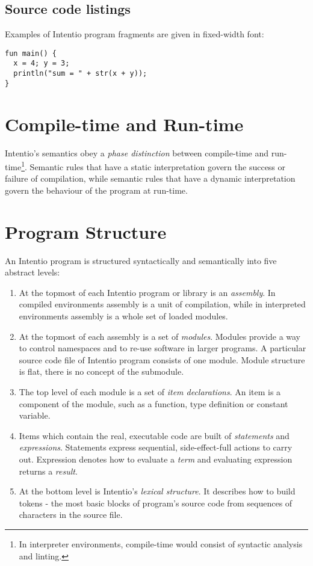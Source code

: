 \subsection*{Source code listings}

Examples of Intentio program fragments are given in fixed-width font:

\begin{lstlisting}
fun main() {
  x = 4; y = 3;
  println("sum = " + str(x + y));
}
\end{lstlisting}


\section{Compile-time and Run-time}

Intentio's semantics obey a \emph{phase distinction} between compile-time and run-time\footnote{In interpreter environments, compile-time would consist of syntactic analysis and linting.}. Semantic rules that have a static interpretation govern the success or failure of compilation, while semantic rules that have a dynamic interpretation govern the behaviour of the program at run-time.


\section{Program Structure}

An Intentio program is structured syntactically and semantically into five abstract levels:

\begin{enumerate}
  \item At the topmost of each Intentio program or library is an \emph{assembly}. In compiled environments assembly is a unit of compilation, while in interpreted environments assembly is a whole set of loaded modules.
  \item At the topmost of each assembly is a set of \emph{modules}. Modules provide a way to control namespaces and to re-use software in larger programs. A particular source code file of Intentio program consists of one module. Module structure is flat, there is no concept of the submodule.
  \item The top level of each module is a set of \emph{item declarations}. An item is a component of the module, such as a function, type definition or constant variable.
  \item Items which contain the real, executable code are built of \emph{statements} and \emph{expressions}. Statements express sequential, side-effect-full actions to carry out. Expression denotes how to evaluate a \emph{term} and evaluating expression returns a \emph{result}.
  \item At the bottom level is Intentio's \emph{lexical structure}. It describes how to build tokens - the most basic blocks of program's source code from sequences of characters in the source file.
\end{enumerate}


